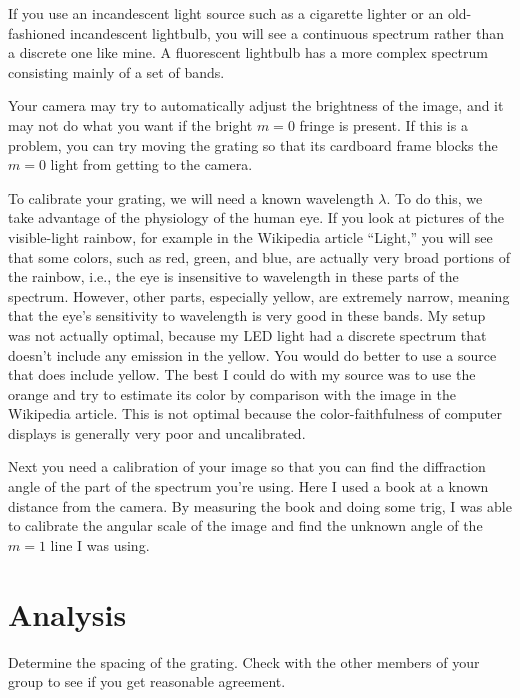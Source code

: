 If you use an incandescent light source such as a cigarette lighter or an old-fashioned incandescent lightbulb, you will see a continuous
spectrum rather than a discrete one like mine. A fluorescent lightbulb has a more complex spectrum consisting mainly of a set of bands.

Your camera may try to automatically adjust the brightness of the image, and it may not do what you want if the bright $m=0$ fringe
is present. If this is a problem, you can try moving the grating so that its cardboard frame blocks the $m=0$ light from getting to the camera.

To calibrate your grating, we will need a known wavelength $\lambda$. To do this, we take advantage of the physiology of the
human eye. If you look at pictures of the visible-light rainbow, for example in the Wikipedia article ``Light,'' you will see
that some colors, such as red, green, and blue, are actually very broad portions of the rainbow, i.e., the eye is insensitive
to wavelength in these parts of the spectrum. However, other parts, especially yellow, are extremely narrow, meaning that
the eye's sensitivity to wavelength is very good in these bands. My setup was not actually optimal, because my LED light
had a discrete spectrum that doesn't include any emission in the yellow. You would do better to use a source that does include
yellow. The best I could do with my source was to use the orange and try to estimate its color by comparison with the image
in the Wikipedia article. This is not optimal because the color-faithfulness of computer displays is generally very poor and
uncalibrated.

Next you need a calibration of your image so that you can find the diffraction angle of the part of the spectrum you're using.
Here I used a book at a known distance from the camera. By measuring the book and doing some trig, I was able to
calibrate the angular scale of the image and find the unknown angle of the $m=1$ line I was using.


\section{Analysis}

Determine the spacing of the grating. Check with the other members of your group to see if you get reasonable agreement.

